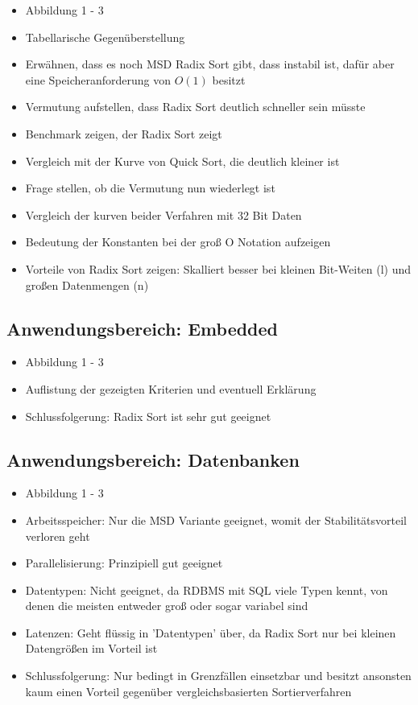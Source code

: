 \documentclass[a4paper, 12pt, oneside]{article}
\begin{document}
    \begin{itemize}
        \item Abbildung 1 - 3
        \item Tabellarische Gegenüberstellung
        \item Erwähnen, dass es noch MSD Radix Sort gibt, dass instabil ist, dafür aber eine Speicheranforderung von $O(1)$ besitzt
        \item Vermutung aufstellen, dass Radix Sort deutlich schneller sein müsste
        \item Benchmark zeigen, der Radix Sort zeigt
        \item Vergleich mit der Kurve von Quick Sort, die deutlich kleiner ist
        \item Frage stellen, ob die Vermutung nun wiederlegt ist
        \item Vergleich der kurven beider Verfahren mit 32 Bit Daten
        \item Bedeutung der Konstanten bei der groß O Notation aufzeigen
        \item Vorteile von Radix Sort zeigen: Skalliert besser bei kleinen Bit-Weiten (l) und großen Datenmengen (n)
    \end{itemize}

    \subsection{Anwendungsbereich: Embedded}

    \begin{itemize}
        \item Abbildung 1 - 3
        \item Auflistung der gezeigten Kriterien und eventuell Erklärung
        \item Schlussfolgerung: Radix Sort ist sehr gut geeignet
    \end{itemize}

    \subsection{Anwendungsbereich: Datenbanken}

    \begin{itemize}
        \item Abbildung 1 - 3
        \item Arbeitsspeicher: Nur die MSD Variante geeignet, womit der Stabilitätsvorteil verloren geht
        \item Parallelisierung: Prinzipiell gut geeignet
        \item Datentypen: Nicht geeignet, da RDBMS mit SQL viele Typen kennt, von denen die meisten entweder groß oder sogar variabel sind
        \item Latenzen: Geht flüssig in 'Datentypen' über, da Radix Sort nur bei kleinen Datengrößen im Vorteil ist
        \item Schlussfolgerung: Nur bedingt in Grenzfällen einsetzbar und besitzt ansonsten kaum einen Vorteil gegenüber vergleichsbasierten Sortierverfahren
    \end{itemize}
\end{document}
